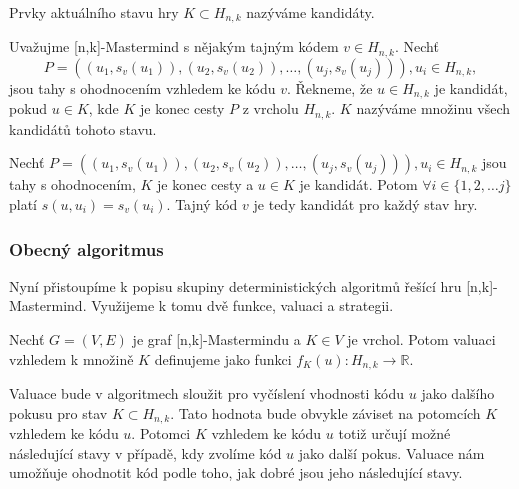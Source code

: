 
Prvky aktuálního stavu hry $K\subset H_{n,k}$ nazýváme kandidáty. 
\begin{definice}[Kandidát]
    Uvažujme [n,k]-Mastermind s nějakým tajným kódem $v\in H_{n,k}$. Nechť 
    \[P = \left((u_1, s_v(u_1)), (u_2,s_v(u_2)), \dots, (u_j,s_v(u_j))\right), u_i \in H_{n,k}, \]
    jsou tahy s ohodnocením vzhledem ke kódu $v$. Řekneme, že $u \in H_{n,k}$ je kandidát, pokud $u \in K$, kde $K$ je konec cesty $P$ z vrcholu $H_{n,k}$. $K$ nazýváme množinu všech kandidátů tohoto stavu. 
\end{definice}
\begin{pozn}
    Nechť $P = \left((u_1, s_v(u_1)), (u_2,s_v(u_2)), \dots, (u_j,s_v(u_j))\right), u_i \in H_{n,k}$ jsou tahy s ohodnocením, $K$ je konec cesty a $u \in K$ je kandidát. Potom $\forall i \in \{1,2,\dots j\}$ platí $s(u,u_i) = s_v(u_i)$. Tajný kód $v$ je tedy kandidát pro každý stav hry. 
\end{pozn}






\subsubsection{Obecný algoritmus}
Nyní přistoupíme k popisu skupiny deterministických algoritmů řešící hru [n,k]-Mastermind. Využijeme k tomu dvě funkce, valuaci a strategii.
\begin{definice}[Valuace]
    Nechť $G = (V,E)$ je graf [n,k]-Mastermindu a $K \in V$ je vrchol. Potom valuaci vzhledem k množině $K$ definujeme jako funkci $f_K(u) \colon H_{n,k} \to \mathbb{R}$.
\end{definice}
Valuace bude v algoritmech sloužit pro vyčíslení vhodnosti kódu $u$ jako dalšího pokusu pro stav $K\subset H_{n,k}$. Tato hodnota bude obvykle záviset na potomcích $K$ vzhledem ke kódu $u$. Potomci $K$ vzhledem ke kódu $u$ totiž určují možné následující stavy v případě, kdy zvolíme kód $u$ jako další pokus. Valuace nám umožňuje ohodnotit kód podle toho, jak dobré jsou jeho následující stavy. 

